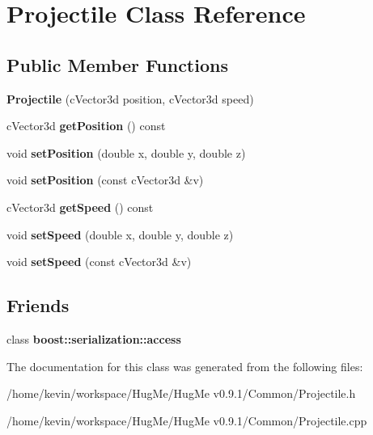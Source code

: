 \hypertarget{classProjectile}{
\section{Projectile Class Reference}
\label{classProjectile}
}
\subsection*{Public Member Functions}
\begin{DoxyCompactItemize}
\item 
\hypertarget{classProjectile_ae83eedae52dc89c07f13d9af3844c0de}{
{\bfseries Projectile} (cVector3d position, cVector3d speed)}
\label{classProjectile_ae83eedae52dc89c07f13d9af3844c0de}

\item 
\hypertarget{classProjectile_aa55d774bc476f9612a4cdf6bbe886458}{
cVector3d {\bfseries getPosition} () const }
\label{classProjectile_aa55d774bc476f9612a4cdf6bbe886458}

\item 
\hypertarget{classProjectile_ab296c86308ef3ee4d4fc62a3379ebf8b}{
void {\bfseries setPosition} (double x, double y, double z)}
\label{classProjectile_ab296c86308ef3ee4d4fc62a3379ebf8b}

\item 
\hypertarget{classProjectile_ab1ae409448bf2ef3bb96a639621fcb46}{
void {\bfseries setPosition} (const cVector3d \&v)}
\label{classProjectile_ab1ae409448bf2ef3bb96a639621fcb46}

\item 
\hypertarget{classProjectile_a2bb207bbf1c0244f0e896de5950ee6b1}{
cVector3d {\bfseries getSpeed} () const }
\label{classProjectile_a2bb207bbf1c0244f0e896de5950ee6b1}

\item 
\hypertarget{classProjectile_a290fb17761a6a523df80791413c1f7b5}{
void {\bfseries setSpeed} (double x, double y, double z)}
\label{classProjectile_a290fb17761a6a523df80791413c1f7b5}

\item 
\hypertarget{classProjectile_a0564d5a2db445e6abf2423f19624f4fb}{
void {\bfseries setSpeed} (const cVector3d \&v)}
\label{classProjectile_a0564d5a2db445e6abf2423f19624f4fb}

\end{DoxyCompactItemize}
\subsection*{Friends}
\begin{DoxyCompactItemize}
\item 
\hypertarget{classProjectile_ac98d07dd8f7b70e16ccb9a01abf56b9c}{
class {\bfseries boost::serialization::access}}
\label{classProjectile_ac98d07dd8f7b70e16ccb9a01abf56b9c}

\end{DoxyCompactItemize}


The documentation for this class was generated from the following files:\begin{DoxyCompactItemize}
\item 
/home/kevin/workspace/HugMe/HugMe v0.9.1/Common/Projectile.h\item 
/home/kevin/workspace/HugMe/HugMe v0.9.1/Common/Projectile.cpp\end{DoxyCompactItemize}
